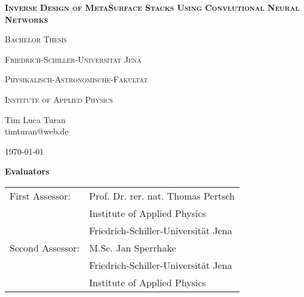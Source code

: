 \begin{titlepage}
	\centering

	{\scshape\Large \textbf{Inverse Design of MetaSurface Stacks Using Convlutional Neural Networks} \par}
	\vspace{1cm}
	{\scshape\Large Bachelor Thesis \par}
	\vspace{8cm}
	{\huge\bfseries \par}
	\vspace{10cm}
	{\scshape\large Friedrich-Schiller-Universität Jena\par}
	{\scshape\large Physikalisch-Astronomische-Fakultät\par}
	{\scshape\large Institute of Applied Physics\par}
	\vfill
	{\Large Tim Luca Turan}\\
	{timturan@web.de}

	\vfill

	{\large \today\par}
\end{titlepage}

\thispagestyle{empty}
\vspace*{\fill}
\textbf{\Large Evaluators}\\[1cm]

\begin{tabular}{ll}
First Assessor: & Prof. Dr. rer. nat. Thomas Pertsch\\
 & Institute of Applied Physics \\
 & Friedrich-Schiller-Universität Jena \\
Second Assessor: & M.Sc. Jan Sperrhake \\
 & Friedrich-Schiller-Universität Jena \\
 & Institute of Applied Physics \\
\end{tabular}
